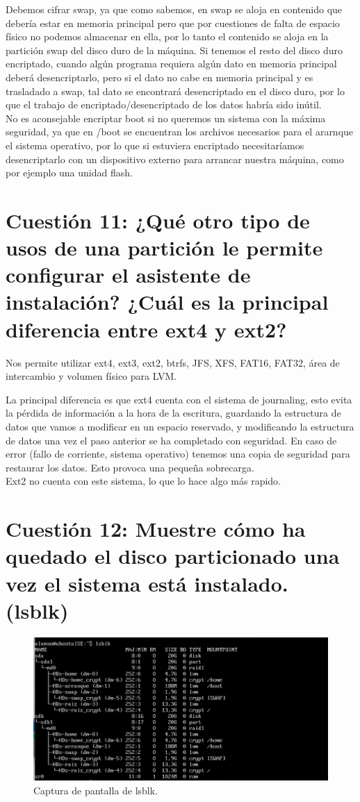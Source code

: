 Debemos cifrar swap, ya que como sabemos, en swap se aloja en contenido que debería estar en memoria principal pero que por cuestiones de falta de espacio físico no podemos almacenar en ella, por lo tanto el contenido se aloja en la partición swap del disco duro de la máquina. Si tenemos el resto del disco duro encriptado, cuando algún programa requiera algún dato en memoria principal deberá desencriptarlo, pero si el dato no cabe en memoria principal y es trasladado a swap, tal dato se encontrará desencriptado en el disco duro, por lo que el trabajo de encriptado/desencriptado de los datos habría sido inútil.\\
No es aconsejable encriptar boot si no queremos un sistema con la máxima seguridad, ya que en /boot se encuentran los archivos necesarios para el ararnque el sistema operativo, por lo que si estuviera encriptado necesitaríamos desencriptarlo con un dispositivo externo para arrancar nuestra máquina, como por ejemplo una unidad flash.

\section{Cuestión 11: ¿Qué otro tipo de usos de una partición le permite configurar el asistente de instalación? ¿Cuál es la principal diferencia entre ext4 y ext2?}

Nos permite utilizar ext4, ext3, ext2, btrfs, JFS, XFS, FAT16, FAT32, área de intercambio y volumen físico para LVM.

La principal diferencia es que ext4 cuenta con el sistema de journaling, esto evita la pérdida de información a la hora de la escritura, guardando la estructura de datos que vamos a modificar en un espacio reservado, y modificando la estructura de datos una vez el paso anterior se ha completado con seguridad. En caso de error (fallo de corriente, sistema operativo) tenemos una copia de seguridad para restaurar los datos. Esto provoca una pequeña sobrecarga.\cite{23}\\
Ext2 no cuenta con este sistema, lo que lo hace algo más rapido.

\section{Cuestión 12: Muestre cómo ha quedado el disco particionado una vez el sistema está instalado. (lsblk)}

\begin{figure}[H]
\centering
\includegraphics[scale=0.8]{lsblk}
\caption{Captura de pantalla de lsblk.}
\end{figure}

